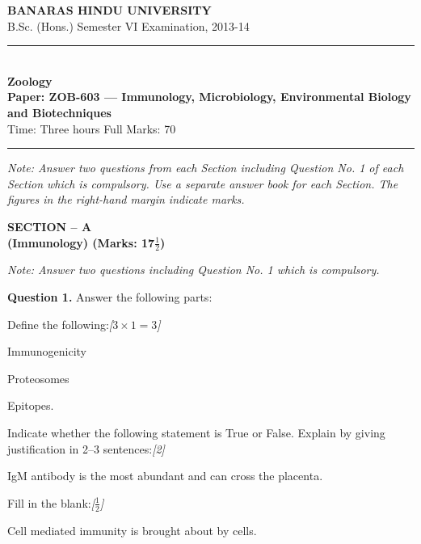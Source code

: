 \documentclass[11pt,a4paper]{article}
\newcommand{\pts}[1]{\hfill   \textit{[#1]}}
\begin{document}
\begin{center}
  {\large\bfseries BANARAS HINDU UNIVERSITY}\\[2pt]
  {\normalsize B.Sc. (Hons.) Semester VI Examination, 2013-14}\\[6pt]
  \rule{0.8\linewidth}{0.5pt}\\[6pt]
  {\large\bfseries Zoology}\\[4pt]
  {\large\bfseries Paper: ZOB-603 --- Immunology, Microbiology, Environmental Biology and Biotechniques}\\[4pt]
  {\normalsize Time: Three hours \hfill Full Marks: 70}
\end{center}

\rule{\linewidth}{0.4pt}

\smallskip



\noindent   \textit{Note: Answer two questions from each Section including Question No. 1 of each Section which is compulsory. Use a separate answer book for each Section. The figures in the right-hand margin indicate marks.}

\bigskip

\begin{center}
   \textbf{SECTION -- A} \\
   \textbf{(Immunology) (Marks: 17$\frac{1}{2}$)}
\end{center}

\smallskip



\noindent   \textit{Note: Answer two questions including Question No. 1 which is compulsory.}

\medskip


\noindent   \textbf{Question 1.} Answer the following parts:

\begin{parts}
  \item Define the following:\pts{$3  \times 1 = 3$}
  
\begin{parts}
    \item Immunogenicity
    \item Proteosomes
    \item Epitopes.
  \end{parts}

  \item Indicate whether the following statement is True or False. Explain by giving justification in 2--3 sentences:\pts{2}
  
\begin{parts}
    \item IgM antibody is the most abundant and can cross the placenta.
  \end{parts}

  \item Fill in the blank:\pts{$\frac{1}{2}$}
  
\begin{parts}
    \item Cell mediated immunity is brought about by \underline{\hspace{2cm}} cells.
  \end{parts}
\end{parts}
\end{document}
